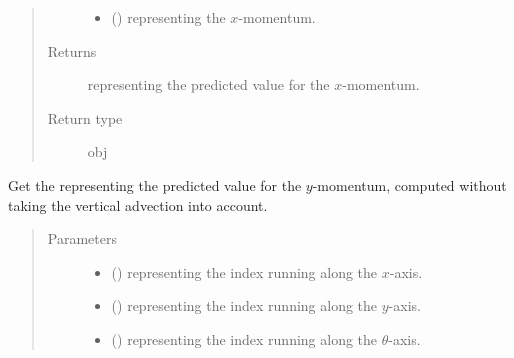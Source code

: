 \documentclass[letterpaper,10pt,english]{sphinxmanual}
\begin{document}
\begin{fulllineitems}
\begin{fulllineitems}
\begin{quote}
\begin{description}
\begin{itemize}
\item {} 
 () \textendash{}  representing the \(x\)-momentum.

\end{itemize}

\item[{Returns}] \leavevmode
{} representing the predicted value for the \(x\)-momentum.

\item[{Return type}] \leavevmode
obj

\end{description}\end{quote}

\end{fulllineitems}


\begin{fulllineitems}
\label{\detokenize{api:tasmania.dycore.flux_isentropic_maccormack.FluxIsentropicMacCormack._get_maccormack_horizontal_predicted_value_V}}
Get the  representing the predicted value for the \(y\)-momentum,
computed without taking the vertical advection into account.
\begin{quote}\begin{description}
\item[{Parameters}] \leavevmode\begin{itemize}
\item {} 
 () \textendash{}  representing the index running along the \(x\)-axis.

\item {} 
 () \textendash{}  representing the index running along the \(y\)-axis.

\item {} 
 () \textendash{}  representing the index running along the \(\theta\)-axis.


\end{itemize}
\end{description}
\end{quote}
\end{fulllineitems}
\end{fulllineitems}
\end{document}
